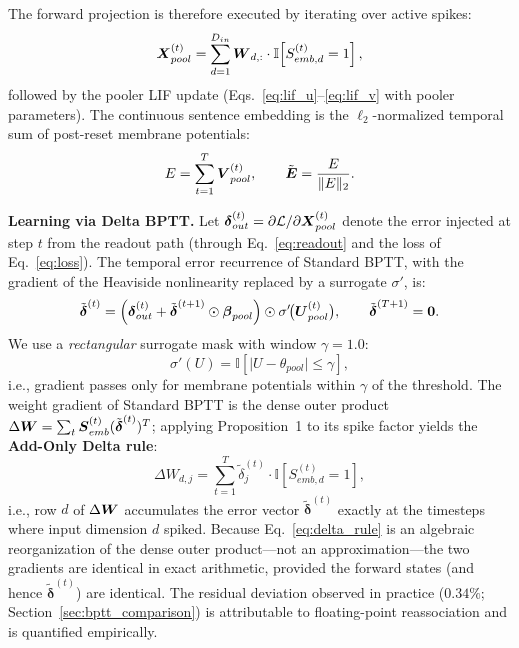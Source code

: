 \documentclass[10pt,journal,compsoc]{IEEEtran}
\begin{document}
\noindent The forward projection is therefore executed by iterating over active spikes:
\begin{equation}
\mX_{pool}^{(t)} = \sum_{d=1}^{D_{in}} \mW_{d,:} \cdot \mathbb{I}\!\left[ S_{emb,d}^{(t)} = 1 \right],
\label{eq:forward}
\end{equation}
followed by the pooler LIF update (Eqs.~\ref{eq:lif_u}--\ref{eq:lif_v} with pooler parameters). The continuous sentence embedding is the $\ell_2$-normalized temporal sum of post-reset membrane potentials:
\begin{equation}
E = \sum_{t=1}^{T} \mV_{pool}^{(t)}, \qquad \tilde{\mE} = \frac{E}{\lVert E \rVert_2}.
\label{eq:readout}
\end{equation}

\textbf{Learning via Delta BPTT.} Let $\boldsymbol{\delta}_{out}^{(t)} = \partial \mathcal{L} / \partial \boldsymbol{X}_{pool}^{(t)}$ denote the error injected at step $t$ from the readout path (through Eq.~\ref{eq:readout} and the loss of Eq.~\ref{eq:loss}). The temporal error recurrence of Standard BPTT, with the gradient of the Heaviside nonlinearity replaced by a surrogate $\sigma'$, is:
\begin{equation}
\tilde{\bm{\delta}}^{(t)} = \left( \bm{\delta}_{out}^{(t)} + \tilde{\bm{\delta}}^{(t+1)} \odot \bm{\beta}_{pool} \right) \odot \sigma'\!\big(\mU_{pool}^{(t)}\big), \qquad \tilde{\bm{\delta}}^{(T+1)} = \bm{0}.
\label{eq:recurrence}
\end{equation}
We use a \emph{rectangular} surrogate mask with window $\gamma = 1.0$:
\begin{equation}
\sigma'(U) = \mathbb{I}\!\left[ \lvert U - \theta_{pool} \rvert \le \gamma \right],
\label{eq:surrogate}
\end{equation}
i.e., gradient passes only for membrane potentials within $\gamma$ of the threshold. The weight gradient of Standard BPTT is the dense outer product $\Delta\boldsymbol{W} = \sum_t \boldsymbol{S}_{emb}^{(t)} (\tilde{\boldsymbol{\delta}}^{(t)})^T$; applying Proposition~1 to its spike factor yields the \textbf{Add-Only Delta rule}:
\begin{equation}
\Delta W_{d,j} = \sum_{t=1}^{T} \tilde{\delta}_j^{(t)} \cdot \mathbb{I}\!\left[ S_{emb,d}^{(t)} = 1 \right],
\label{eq:delta_rule}
\end{equation}
i.e., row $d$ of $\Delta\boldsymbol{W}$ accumulates the error vector $\tilde{\bm{\delta}}^{(t)}$ exactly at the timesteps where input dimension $d$ spiked. Because Eq.~\ref{eq:delta_rule} is an algebraic reorganization of the dense outer product---not an approximation---the two gradients are identical in exact arithmetic, provided the forward states (and hence $\tilde{\bm{\delta}}^{(t)}$) are identical. The residual deviation observed in practice ($0.34\%$; Section~\ref{sec:bptt_comparison}) is attributable to floating-point reassociation and is quantified empirically.
\end{document}
